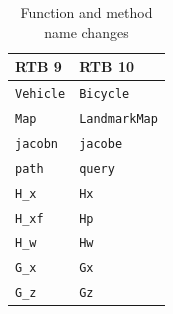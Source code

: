 \documentclass[a4paper,twoside]{report}
\begin{document}
\begin{table}
\centering
\begin{tabular}{|l|l|}\hline
\textbf{RTB 9} & \textbf{RTB 10} \\ \hline\hline
\texttt{Vehicle} & \texttt{Bicycle}\\
\texttt{Map} & \texttt{LandmarkMap} \\
\texttt{jacobn} & \texttt{jacobe} \\
\texttt{path} & \texttt{query} \\
\texttt{H\_x} & \texttt{Hx} \\
\texttt{H\_xf} & \texttt{Hp} \\
\texttt{H\_w} & \texttt{Hw} \\
\texttt{G\_x} & \texttt{Gx} \\
\texttt{G\_z} & \texttt{Gz} \\ \hline
\end{tabular}
\caption{Function and method name changes}\label{tab:changes}
\end{table}
\end{document}
